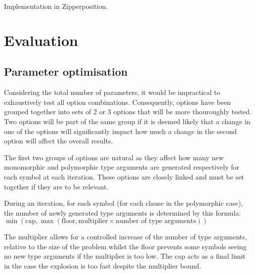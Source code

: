 \documentclass[]{ceurart}
\begin{document}
Implementation in Zipperposition.

\section{Evaluation}
\label{sec:evaluation}


\subsection{Parameter optimisation}

Considering the total number of parameters, it would be impractical to exhaustively test all option combinations. Consequently, options have been grouped together into sets of 2 or 3 options that will be more thouroughly tested. Two options will be part of the same group if it is deemed likely that a change in one of the options will significantly impact how much a change in the second option will affect the overall results.

The first two groups of options are natural as they affect how many new monomorphic and polymorphic type arguments are generated respectively for each symbol at each iteration. These options are closely linked and must be set together if they are to be relevant.

During an iteration, for each symbol (for each clause in the polymorphic case), the number of newly generated type arguments is determined by this formula:
\( \min(\text{cap}, \max(\text{floor}, \text{multiplier} \times \text{number of type arguments})) \)

The multiplier allows for a controlled increase of the number of type arguments, relative to the size of the problem whilst the floor prevents some symbols seeing no new type arguments if the multiplier is too low.
The cap acts as a final limit in the case the explosion is too fast despite the multiplier bound.
\end{document}

